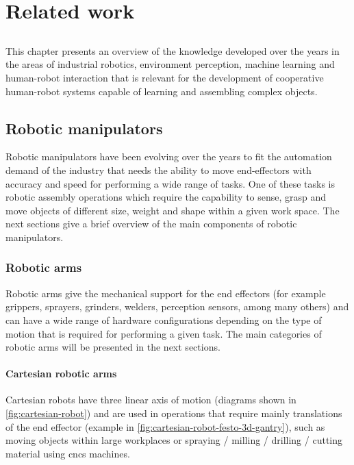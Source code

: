 \chapter{Related work}\label{chap:related-work}

\section*{}

This chapter presents an overview of the knowledge developed over the years in the areas of industrial robotics, environment perception, machine learning and human-robot interaction that is relevant for the development of cooperative human-robot systems capable of learning and assembling complex objects.


\section{Robotic manipulators}

Robotic manipulators have been evolving over the years to fit the automation demand of the industry that needs the ability to move end-effectors with accuracy and speed for performing a wide range of tasks. One of these tasks is robotic assembly operations which require the capability to sense, grasp and move objects of different size, weight and shape within a given work space. The next sections give a brief overview of the main components of robotic manipulators.


\subsection{Robotic arms}

Robotic arms give the mechanical support for the end effectors (for example grippers, sprayers, grinders, welders, perception sensors, among many others) and can have a wide range of hardware configurations depending on the type of motion that is required for performing a given task. The main categories of robotic arms will be presented in the next sections.


\subsubsection{Cartesian robotic arms}

Cartesian robots have three linear axis of motion (diagrams shown in \cref{fig:cartesian-robot}) and are used in operations that require mainly translations of the end effector (example in \cref{fig:cartesian-robot-festo-3d-gantry}), such as moving objects within large workplaces or spraying / milling / drilling / cutting material using \glspl{cnc} machines.

